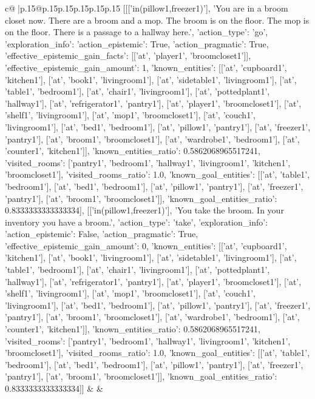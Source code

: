 \documentclass{article}
\begin{document}
{\begin{supertabular}{c@{$\;$}|p{.15\linewidth}@{}p{.15\linewidth}p{.15\linewidth}p{.15\linewidth}p{.15\linewidth}p{.15\linewidth}}
{{{	 [[['in(pillow1,freezer1)'], 'You are in a broom closet now. There are a broom and a mop. The broom is on the floor. The mop is on the floor. There is a passage to a hallway here.', {'action_type': 'go', 'exploration_info': {'action_epistemic': True, 'action_pragmatic': True, 'effective_epistemic_gain_facts': [['at', 'player1', 'broomcloset1']], 'effective_epistemic_gain_amount': 1, 'known_entities': [['at', 'cupboard1', 'kitchen1'], ['at', 'book1', 'livingroom1'], ['at', 'sidetable1', 'livingroom1'], ['at', 'table1', 'bedroom1'], ['at', 'chair1', 'livingroom1'], ['at', 'pottedplant1', 'hallway1'], ['at', 'refrigerator1', 'pantry1'], ['at', 'player1', 'broomcloset1'], ['at', 'shelf1', 'livingroom1'], ['at', 'mop1', 'broomcloset1'], ['at', 'couch1', 'livingroom1'], ['at', 'bed1', 'bedroom1'], ['at', 'pillow1', 'pantry1'], ['at', 'freezer1', 'pantry1'], ['at', 'broom1', 'broomcloset1'], ['at', 'wardrobe1', 'bedroom1'], ['at', 'counter1', 'kitchen1']], 'known_entities_ratio': 0.5862068965517241, 'visited_rooms': ['pantry1', 'bedroom1', 'hallway1', 'livingroom1', 'kitchen1', 'broomcloset1'], 'visited_rooms_ratio': 1.0, 'known_goal_entities': [['at', 'table1', 'bedroom1'], ['at', 'bed1', 'bedroom1'], ['at', 'pillow1', 'pantry1'], ['at', 'freezer1', 'pantry1'], ['at', 'broom1', 'broomcloset1']], 'known_goal_entities_ratio': 0.8333333333333334}}], [['in(pillow1,freezer1)'], 'You take the broom. In your inventory you have a broom.', {'action_type': 'take', 'exploration_info': {'action_epistemic': False, 'action_pragmatic': True, 'effective_epistemic_gain_amount': 0, 'known_entities': [['at', 'cupboard1', 'kitchen1'], ['at', 'book1', 'livingroom1'], ['at', 'sidetable1', 'livingroom1'], ['at', 'table1', 'bedroom1'], ['at', 'chair1', 'livingroom1'], ['at', 'pottedplant1', 'hallway1'], ['at', 'refrigerator1', 'pantry1'], ['at', 'player1', 'broomcloset1'], ['at', 'shelf1', 'livingroom1'], ['at', 'mop1', 'broomcloset1'], ['at', 'couch1', 'livingroom1'], ['at', 'bed1', 'bedroom1'], ['at', 'pillow1', 'pantry1'], ['at', 'freezer1', 'pantry1'], ['at', 'broom1', 'broomcloset1'], ['at', 'wardrobe1', 'bedroom1'], ['at', 'counter1', 'kitchen1']], 'known_entities_ratio': 0.5862068965517241, 'visited_rooms': ['pantry1', 'bedroom1', 'hallway1', 'livingroom1', 'kitchen1', 'broomcloset1'], 'visited_rooms_ratio': 1.0, 'known_goal_entities': [['at', 'table1', 'bedroom1'], ['at', 'bed1', 'bedroom1'], ['at', 'pillow1', 'pantry1'], ['at', 'freezer1', 'pantry1'], ['at', 'broom1', 'broomcloset1']], 'known_goal_entities_ratio': 0.8333333333333334}}]] 
	  } 
	   } 
	   } 
	 & & \\ 
 


\end{supertabular}}
\end{document}
